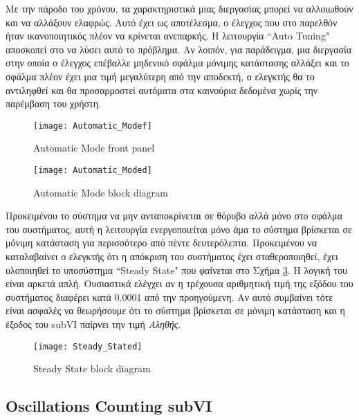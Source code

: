Με την πάροδο του χρόνου, τα χαρακτηριστικά μιας διεργασίας μπορεί να αλλοιωθούν και να αλλάξουν ελαφρώς. Αυτό έχει ως αποτέλεσμα, ο έλεγχος που στο παρελθόν ήταν ικανοποιητικός πλέον να κρίνεται ανεπαρκής. Η λειτουργία ``Auto Tuning" αποσκοπεί στο να λύσει αυτό το πρόβλημα. Αν λοιπόν, για παράδειγμα, μια διεργασία στην οποία ο έλεγχος επέβαλλε μηδενικό σφάλμα μόνιμης κατάστασης αλλάξει και το σφάλμα πλέον έχει μια τιμή μεγαλύτερη από την αποδεκτή, ο ελεγκτής θα το αντιληφθεί και θα προσαρμοστεί αυτόματα στα καινούρια δεδομένα χωρίς την παρέμβαση του χρήστη.

\begin{figure}[h]
  \centering
  \texttt{[image: Automatic\_Modef]}
  \caption{Automatic Mode front panel}
  \label{fig:Automatic_Modef}
\end{figure}

\begin{figure}[h]
  \centering
  \texttt{[image: Automatic\_Moded]}
  \caption{Automatic Mode block diagram}
  \label{fig:Automatic_Moded}
\end{figure}

Προκειμένου το σύστημα να μην ανταποκρίνεται σε θόρυβο αλλά μόνο στο σφάλμα του συστήματος, αυτή η λειτουργία ενεργοποιείται μόνο άμα το σύστημα βρίσκεται σε μόνιμη κατάσταση για περισσότερο από πέντε δευτερόλεπτα. Προκειμένου να καταλαβαίνει ο ελεγκτής ότι η απόκριση του συστήματος έχει σταθεροποιηθεί, έχει υλοποιηθεί το υποσύστημα ``Steady State" που φαίνεται στο Σχήμα \ref{fig:Steady_Stated}. Η λογική του είναι αρκετά απλή. Ουσιαστικά ελέγχει αν η τρέχουσα αριθμητική τιμή της εξόδου του συστήματος διαφέρει κατά $0.0001$ από την προηγούμενη. Αν αυτό συμβαίνει τότε είναι ασφαλές να θεωρήσουμε ότι το σύστημα βρίσκεται σε μόνιμη κατάσταση και η έξοδος του subVI παίρνει την τιμή \textit{Αληθής}. 

\begin{figure}[h]
  \centering
  \texttt{[image: Steady\_Stated]}
  \caption{Steady State block diagram}
  \label{fig:Steady_Stated}
\end{figure}

\subsection{Oscillations Counting subVI}

